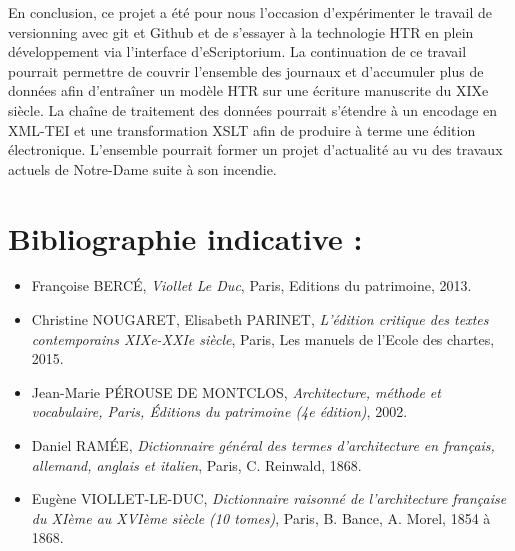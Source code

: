\documentclass{article}
\begin{document}
En conclusion, ce projet a été pour nous l’occasion d’expérimenter le travail de versionning avec git et Github et de s’essayer à la technologie HTR en plein développement via l’interface d’eScriptorium. La continuation de ce travail pourrait permettre de couvrir l’ensemble des journaux et d’accumuler plus de données afin d’entraîner un modèle HTR sur une écriture manuscrite du XIXe siècle. La chaîne de traitement des données pourrait s’étendre à un encodage en XML-TEI et une transformation XSLT afin de produire à terme une édition électronique. L’ensemble pourrait former un projet d’actualité au vu des travaux actuels de Notre-Dame suite à son incendie.



\section*{Bibliographie indicative :}


\begin{itemize}
\item  Françoise BERCÉ, \textit{Viollet Le Duc}, Paris, Editions du patrimoine, 2013. 


\item Christine NOUGARET, Elisabeth PARINET, \textit{L’édition critique des textes contemporains XIXe-XXIe siècle}, Paris, Les manuels de l’Ecole des chartes, 2015. 

\item Jean-Marie PÉROUSE DE MONTCLOS, \textit{Architecture, méthode et vocabulaire, Paris, Éditions du patrimoine (4e édition)}, 2002. 

\item Daniel RAMÉE, \textit{Dictionnaire général des termes d'architecture en français, allemand, anglais et italien}, Paris, C. Reinwald, 1868.

\item Eugène VIOLLET-LE-DUC, \textit{Dictionnaire raisonné de l'architecture française du XIème au XVIème siècle (10 tomes)}, Paris, B. Bance, A. Morel, 1854 à 1868.

\end{itemize}
\end{document}
